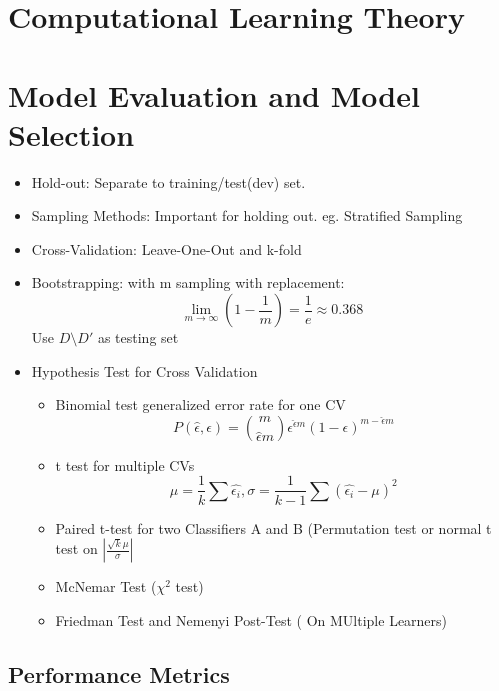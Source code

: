 \documentclass[11pt, openany]{book}              %
\begin{document}
\chapter{Computational Learning Theory}

\chapter{Model Evaluation and Model Selection}

\begin{itemize}
    \item Hold-out: Separate to training/test(dev) set.
    \item Sampling Methods: Important for holding out. eg. Stratified Sampling
    \item Cross-Validation: Leave-One-Out and k-fold
    \item Bootstrapping: with m sampling with replacement:
    $$ \lim_{m \to \infty} (1-\frac{1}{m}) = \frac{1}{e} \approx 0.368$$ Use $D \setminus D'$ as testing set
    \item Hypothesis Test for Cross Validation
     \begin{itemize}
     \item Binomial test generalized error rate for one CV
    $$P(\hat{\epsilon}, \epsilon) = {m\choose \hat{\epsilon} m} \epsilon^{\hat{\epsilon} m}(1-\epsilon)^{m-\hat{\epsilon}m}$$ 
     \item t test for multiple CVs
    $$\mu = \frac{1}{k} \sum \hat{\epsilon_i}, \sigma = \frac{1}{k-1}\sum (\hat{\epsilon_i} - \mu )^2$$ 
    \item Paired t-test for two Classifiers A and B (Permutation test or normal t test on $|\frac{\sqrt{k}\mu}{\sigma}|$
    \item McNemar Test ($\chi^2$ test)
    \item Friedman Test and Nemenyi Post-Test ( On MUltiple Learners)
    \end{itemize}
\end{itemize}


\section{Performance Metrics}
\end{document}
